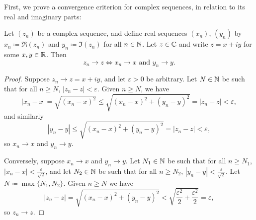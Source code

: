 \documentclass[../analysis1.tex]{subfiles}
\begin{document}
First, we prove a convergence criterion for complex sequences, in relation to its real and imaginary parts:
\begin{theorem}
\label{thm:complexrealconvergence}
    \begin{shaded*}
        Let $(z_n)$ be a complex sequence, and define real sequences $(x_n)$, $(y_n)$ by $x_n\coloneqq \Re(z_n)$ and $y_n\coloneqq\Im(z_n)$ for all $n\in\mathbb{N}$. Let $z\in \mathbb{C}$ and write $z=x+iy$ for some $x,y\in\mathbb{R}$. Then $$z_n\to z\iff x_n\to x\text{ and }y_n\to y.$$
    \end{shaded*}
\end{theorem}
\begin{proof}
    Suppose $z_n\to z=x+iy$, and let $\varepsilon>0$ be arbitrary. Let $N\in\mathbb{N}$ be such that for all $n\ge N$, $|z_n-z|<\varepsilon$. Given $n\ge N$, we have $$|x_n-x|=\sqrt{(x_n-x)^2}\le \sqrt{(x_n-x)^2+(y_n-y)^2}=|z_n-z|<\varepsilon,$$ and similarly $$|y_n-y|\le\sqrt{(x_n-x)^2+(y_n-y)^2} =|z_n-z|<\varepsilon,$$so $x_n\to x$ and $y_n\to y$.\par
    Conversely, suppose $x_n\to x$ and $y_n\to y$. Let $N_1\in\mathbb{N}$ be such that for all $n\ge N_1$, $|x_n-x|<\frac{\varepsilon}{\sqrt{2}}$, and let $N_2\in\mathbb{N}$ be such that for all $n\ge N_2$, $|y_n-y|<\frac{\varepsilon}{\sqrt{2}}$. Let $N\coloneqq\max\{N_1,N_2\}$. Given $n\ge N$ we have $$|z_n-z|=\sqrt{(x_n-x)^2+(y_n-y)^2}<\sqrt{\frac{\varepsilon^2}{2}+\frac{\varepsilon^2}{2}}=\varepsilon,$$so $z_n\to z$.\qedhere
\end{proof}
\end{document}
